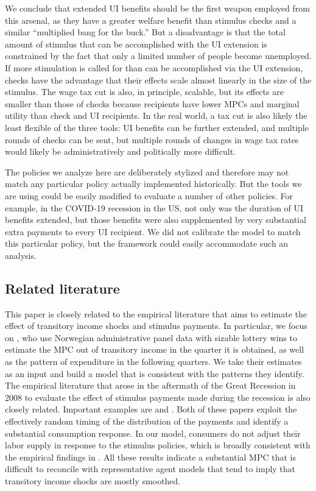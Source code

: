 \documentclass[\econtexRoot/HAFiscal]{subfiles}
\begin{document}
We conclude that extended UI benefits should be the first weapon employed from this arsenal, as they have a greater welfare benefit than stimulus checks and a similar ``multiplied bang for the buck.'' But a disadvantage is that the total amount of stimulus that can be accomplished with the UI extension is constrained by the fact that only a limited number of people become unemployed.  If more stimulation is called for than can be accomplished via the UI extension, checks have the advantage that their effects scale almost linearly in the size of the stimulus.  The wage tax cut is also, in principle, scalable, but its effects are smaller than those of checks because recipients have lower MPCs and marginal utility than check and UI recipients.  In the real world, a tax cut is also likely the least flexible of the three tools:  UI benefits can be further extended, and multiple rounds of checks can be sent, but multiple rounds of changes in wage tax rates would likely be administratively and politically more difficult.

The policies we analyze here are deliberately stylized and therefore may not match any particular policy actually implemented historically.  But the tools we are using could be easily modified to evaluate a number of other policies.  For example, in the COVID-19 recession in the US, not only was the duration of UI benefits extended, but those benefits were also supplemented by very substantial extra payments to every UI recipient.  We did not calibrate the model to match this particular policy, but the framework could easily accommodate such an analysis.

\subsection{Related literature}
\notinsubfile{\label{sec:lit}}

This paper is closely related to the empirical literature that aims to estimate the effect of transitory income shocks and stimulus payments. In particular, we focus on \cite{fagereng_mpc_2021}, who use Norwegian administrative panel data with sizable lottery wins to estimate the MPC out of transitory income in the quarter it is obtained, as well as the pattern of expenditure in the following quarters. We take their estimates as an input and build a model that is consistent with the patterns they identify. The empirical literature that arose in the aftermath of the Great Recession in 2008 to evaluate the effect of stimulus payments made during the recession is also closely related. Important examples are \cite{parker2013consumer} and \cite{broda2014economic}. Both of these papers exploit the effectively random timing of the distribution of the payments and identify a substantial consumption response. In our model, consumers do not adjust their labor supply in response to the stimulus policies, which is broadly consistent with the empirical findings in \cite{ganong2022spending}. All these results indicate a substantial MPC that is difficult to reconcile with representative agent models that tend to imply that transitory income shocks are mostly smoothed. 
\end{document}
